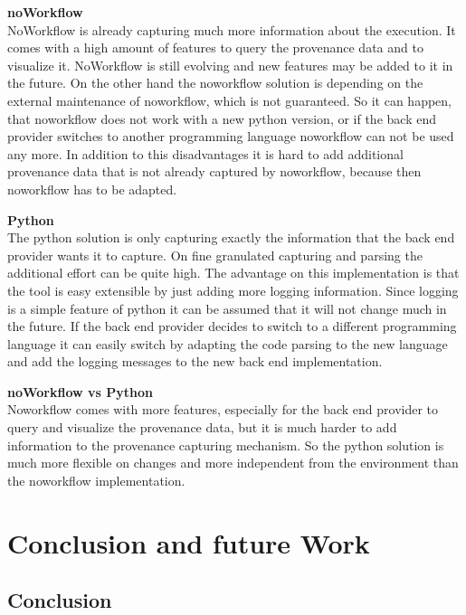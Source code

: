 \documentclass[draft,final]{vutinfth} %
\begin{document}
\textbf{noWorkflow} \\
NoWorkflow is already capturing much more information about the execution. It comes with a high amount of features to query the provenance data and to visualize it. NoWorkflow is still evolving and new features may be added to it in the future. On the other hand the noworkflow solution is depending on the external maintenance of noworkflow, which is not guaranteed. So it can happen, that noworkflow does not work with a new python version, or if the back end provider switches to another programming language noworkflow can not be used any more. In addition to this disadvantages it is hard to add additional provenance data that is not already captured by noworkflow, because then noworkflow has to be adapted.

\textbf{Python} \\
The python solution is only capturing exactly the information that the back end provider wants it to capture. On fine granulated capturing and parsing the additional effort can be quite high. The advantage on this implementation is that the tool is easy extensible by just adding more logging information. Since logging is a simple feature of python it can be assumed that it will not change much in the future. If the back end provider decides to switch to a different programming language it can easily switch by adapting the code parsing to the new language and add the logging messages to the new back end implementation. 

\textbf{noWorkflow vs Python} \\
Noworkflow comes with more features, especially for the back end provider to query and visualize the provenance data, but it is much harder to add information to the provenance capturing mechanism. So the python solution is much more flexible on changes and more independent from the environment than the noworkflow implementation. 

\chapter{Conclusion and future Work}\label{Conclusion}


\section{Conclusion}
\end{document}
